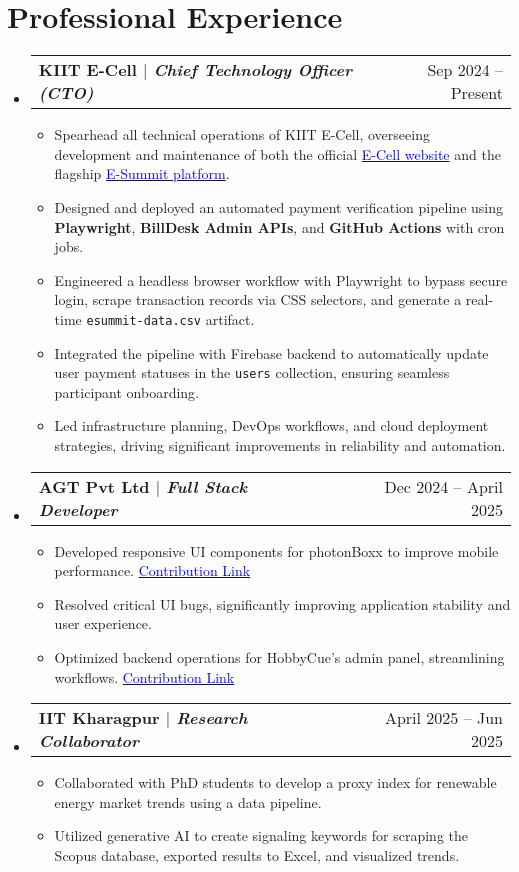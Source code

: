 \documentclass[letterpaper,11pt]{article}
\makeatletter
\newcommand{\resumeItem}[1]{\item\small{#1 \vspace{-3pt}}}
\newcommand{\resumeProjectHeading}[2]{
  \item
  \begin{tabular*}{0.98\textwidth}{l@{\extracolsep{\fill}}r}
    \small\bfseries#1 & \small#2 \\
  \end{tabular*}\vspace{-6pt}
}
\newcommand{\resumeSubHeadingListStart}{\begin{itemize}[leftmargin=0.1in, label={}]}
\newcommand{\resumeSubHeadingListEnd}{\end{itemize}\vspace{-6pt}}
\newcommand{\resumeItemListStart}{\begin{itemize}}
\newcommand{\resumeItemListEnd}{\end{itemize}\vspace{-6pt}}
\makeatother
\begin{document}
\section{Professional Experience}
\vspace{2pt}
\resumeSubHeadingListStart
  \resumeProjectHeading{\textbf{KIIT E-Cell} $|$ \emph{Chief Technology Officer (CTO)}}{Sep 2024 -- Present}
  \resumeItemListStart
    \resumeItem{Spearhead all technical operations of KIIT E-Cell, overseeing development and maintenance of both the official \href{https://kiitecell.org/}{\textcolor{blue}{E-Cell website}} and the flagship \href{https://esummit.kiitecell.org/}{\textcolor{blue}{E-Summit platform}}.}
    \resumeItem{Designed and deployed an automated payment verification pipeline using \textbf{Playwright}, \textbf{BillDesk Admin APIs}, and \textbf{GitHub Actions} with cron jobs.}
    \resumeItem{Engineered a headless browser workflow with Playwright to bypass secure login, scrape transaction records via CSS selectors, and generate a real-time \texttt{esummit-data.csv} artifact.}
    \resumeItem{Integrated the pipeline with Firebase backend to automatically update user payment statuses in the \texttt{users} collection, ensuring seamless participant onboarding.}
    \resumeItem{Led infrastructure planning, DevOps workflows, and cloud deployment strategies, driving significant improvements in reliability and automation.}
  \resumeItemListEnd

  \resumeProjectHeading{\textbf{AGT Pvt Ltd} $|$ \emph{Full Stack Developer}}{Dec 2024 -- April 2025}
  \resumeItemListStart
    \resumeItem{Developed responsive UI components for photonBoxx to improve mobile performance. \href{https://sujays-organization-1.gitbook.io/photonboxx-contribution/}{\textcolor{blue}{Contribution Link}}}
    \resumeItem{Resolved critical UI bugs, significantly improving application stability and user experience.}
    \resumeItem{Optimized backend operations for HobbyCue's admin panel, streamlining workflows. \href{https://sujays-organization-1.gitbook.io/untitled/}{\textcolor{blue}{Contribution Link}}}
  \resumeItemListEnd

  \resumeProjectHeading{\textbf{IIT Kharagpur} $|$ \emph{Research Collaborator}}{April 2025 -- Jun 2025}
  \resumeItemListStart
    \resumeItem{Collaborated with PhD students to develop a proxy index for renewable energy market trends using a data pipeline.}
    \resumeItem{Utilized generative AI to create signaling keywords for scraping the Scopus database, exported results to Excel, and visualized trends.}
  \resumeItemListEnd
\resumeSubHeadingListEnd
\end{document}
